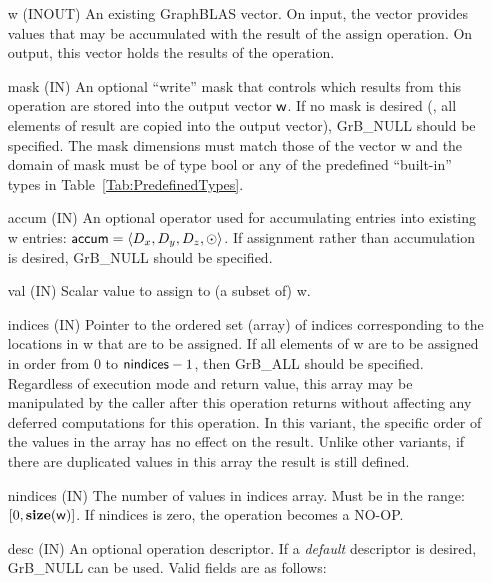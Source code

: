 \begin{itemize}[leftmargin=1.1in]
    \item[{\sf w}]    ({\sf INOUT}) An existing GraphBLAS vector.  On input,
    the vector provides values that may be accumulated with the result of the
    assign operation.  On output, this vector holds the results of the
    operation.

    \item[{\sf mask}]  ({\sf IN}) An optional ``write'' mask that controls which
    results from this operation are stored into the output vector
    ${\sf w}$.  If no mask is desired (\ie, all elements
    of result are copied into the output vector), {\sf GrB\_NULL}
    should be specified. The mask dimensions must match those of the
    vector {\sf w} and the domain of {\sf mask} must be
    of type {\sf bool} or any of the predefined ``built-in'' types in
    Table~\ref{Tab:PredefinedTypes}.

    \item[{\sf accum}]    ({\sf IN}) An optional operator used for accumulating
    entries into existing {\sf w} entries: ${\sf accum} = \langle D_x,
    D_y, D_z,\odot \rangle$. If assignment rather than accumulation is
    desired, {\sf GrB\_NULL} should be specified.

    \item[{\sf val}]      ({\sf IN}) Scalar value to assign to (a subset of) {\sf w}.
    
    \item[{\sf indices}]  ({\sf IN}) Pointer to the ordered set (array) of 
    indices corresponding to the locations in {\sf w} that are to be assigned.  
    If all elements of {\sf w} are to be assigned in order from $0$ to 
    ${\sf nindices} - 1$, then {\sf GrB\_ALL} should be specified.  Regardless of 
    execution mode and return value, this array may be manipulated by the caller
    after this operation returns without affecting any deferred computations for 
    this operation.  In this variant, the specific order of the values in the
    array has no effect on the result.  Unlike other variants, if there are 
    duplicated values in this array the result is still defined.
    
    \item[{\sf nindices}] ({\sf IN}) The number of values in {\sf indices} array.
    Must be in the range: $[0, \bold{size}({\sf w})]$.  If {\sf nindices}
    is zero, the operation becomes a NO-OP.

    \item[{\sf desc}]     ({\sf IN}) An optional operation descriptor.  If a 
    \emph{default} descriptor is desired, {\sf GrB\_NULL} can be used.  Valid 
    fields are as follows: \\
    

\end{itemize}
